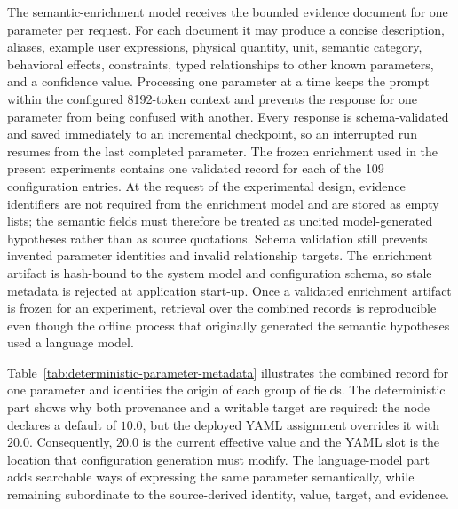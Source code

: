 The semantic-enrichment model receives the bounded evidence document for one parameter per request. For each document it may produce a concise description, aliases, example user expressions, physical quantity, unit, semantic category, behavioral effects, constraints, typed relationships to other known parameters, and a confidence value. Processing one parameter at a time keeps the prompt within the configured 8192-token context and prevents the response for one parameter from being confused with another. Every response is schema-validated and saved immediately to an incremental checkpoint, so an interrupted run resumes from the last completed parameter. The frozen enrichment used in the present experiments contains one validated record for each of the 109 configuration entries. At the request of the experimental design, evidence identifiers are not required from the enrichment model and are stored as empty lists; the semantic fields must therefore be treated as uncited model-generated hypotheses rather than as source quotations. Schema validation still prevents invented parameter identities and invalid relationship targets. The enrichment artifact is hash-bound to the system model and configuration schema, so stale metadata is rejected at application start-up. Once a validated enrichment artifact is frozen for an experiment, retrieval over the combined records is reproducible even though the offline process that originally generated the semantic hypotheses used a language model.

Table~\ref{tab:deterministic-parameter-metadata} illustrates the combined record for one parameter and identifies the origin of each group of fields. The deterministic part shows why both provenance and a writable target are required: the node declares a default of \(10.0\), but the deployed YAML assignment overrides it with \(20.0\). Consequently, \(20.0\) is the current effective value and the YAML slot is the location that configuration generation must modify. The language-model part adds searchable ways of expressing the same parameter semantically, while remaining subordinate to the source-derived identity, value, target, and evidence.

